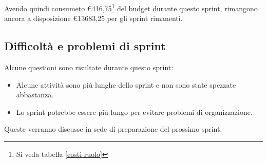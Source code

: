 Avendo quindi consumeto €416,75\footnote{Si veda tabella \ref{costi-ruolo}} del budget durante questo sprint, rimangono ancora a disposizione €13683,25 per gli sprint rimanenti.

\subsection{Difficoltà e problemi di sprint}

Alcune questioni sono risultate durante questo sprint:

\begin{itemize}
    \item Alcune attività sono più lunghe dello sprint e non sono state spezzate abbastanza.
    \item Lo sprint potrebbe essere più lungo per evitare problemi di organizzazione. 
\end{itemize}

Queste verranno discusse in sede di preparazione del prossimo sprint.
